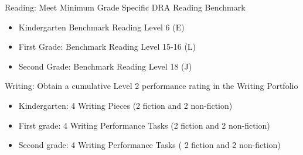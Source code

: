 \documentclass[12pt,letterpaper]{article}
\begin{document}
Reading: Meet Minimum Grade Specific DRA Reading Benchmark
\begin{itemize}
\item Kindergarten Benchmark Reading Level 6 (E)
\item First Grade: Benchmark Reading Level 15-16 (L)
\item Second Grade: Benchmark Reading Level 18 (J)
\end{itemize}
Writing: Obtain a cumulative Level 2 performance rating in the Writing Portfolio
\begin{itemize}
\item Kindergarten: 4 Writing Pieces (2 fiction and 2 non-fiction)
\item First grade: 4 Writing Performance Tasks (2 fiction and 2 non-fiction)
\item Second grade: 4 Writing Performance Tasks ( 2 fiction and 2 non-fiction)
\end{itemize}
\end{document}
